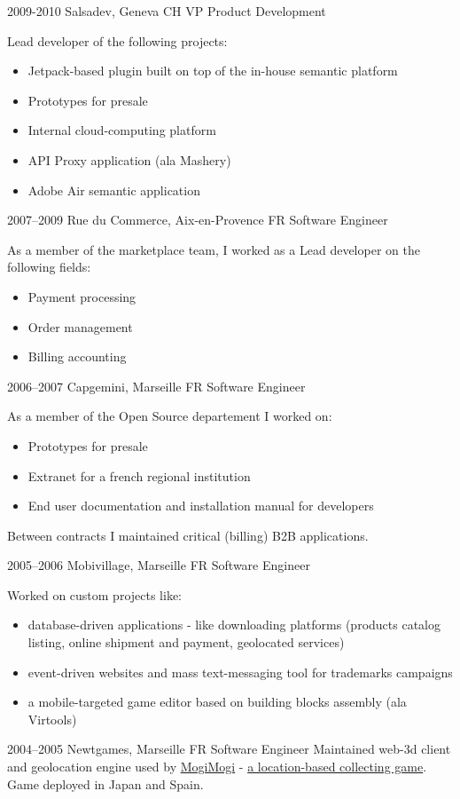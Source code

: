 \documentclass[]{friggeri}
\begin{document}
\begin{entrylist}
  \entry
    {2009-2010}
    {Salsadev, Geneva CH}
    {VP Product Development}
    {Lead developer of the following projects:
    \begin{itemize}
    \item Jetpack-based plugin built on top of the in-house semantic platform
    \item Prototypes for presale
    \item Internal cloud-computing platform
    \item API Proxy application (ala Mashery)
    \item Adobe Air semantic application
    \end{itemize}}
  \entry
    {2007–2009}
    {Rue du Commerce, Aix-en-Provence FR}
    {Software Engineer}
    {As a member of the marketplace team, I worked as a Lead developer on the
    following fields:
    \begin{itemize}
    \item Payment processing
    \item Order management
    \item Billing accounting
    \end{itemize}}
  \entry
    {2006–2007}
    {Capgemini, Marseille FR}
    {Software Engineer}
    {As a member of the Open Source departement I worked on:
    \begin{itemize}
    \item Prototypes for presale
    \item Extranet for a french regional institution
    \item End user documentation and installation manual for developers
    \end{itemize}
    Between contracts I maintained critical (billing) B2B applications.}
  \entry
    {2005–2006}
    {Mobivillage, Marseille FR}
    {Software Engineer}
    {Worked on custom projects like:
    \begin{itemize}
    \item database-driven applications - like downloading platforms
    (products catalog listing, online shipment and payment, geolocated services)
    \item event-driven websites and mass text-messaging tool for
    trademarks campaigns
    \item a mobile-targeted game editor based on building blocks
    assembly (ala Virtools)
    \end{itemize}}
  \entry
    {2004–2005}
    {Newtgames, Marseille FR}
    {Software Engineer}
    {Maintained web-3d client and geolocation engine used by
    \href{http://mogimogi.com}{MogiMogi} - \href{http://thefeaturearchives.com/100501.html}{a location-based collecting game}.
    Game deployed in Japan and Spain.}
\end{entrylist}
\end{document}
